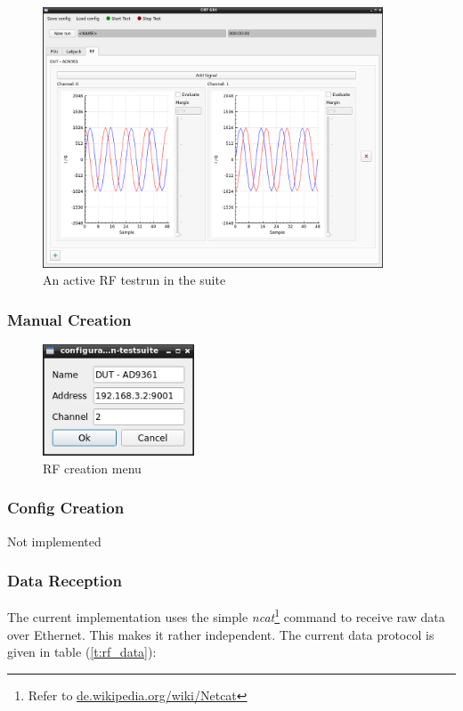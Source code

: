 \documentclass[10pt,a4paper]{article}
\begin{document}
		\begin{figure}[H]
\centering
\includegraphics[width=0.9\textwidth]{./6_RF_example.png}
\caption{An active RF testrun in the suite}
\label{f:rf_example}
		\end{figure}
	
		\subsubsection{Manual Creation}

		\begin{figure}[H]
\centering
\includegraphics[width=0.4\textwidth]{./6_RF_menu.png}
\caption{RF creation menu}
\label{f:rf_menu}
		\end{figure}
			
		\subsubsection{Config Creation}
		Not implemented
	
		\subsubsection{Data Reception}
		The current implementation uses the simple \textit{ncat}\footnote{Refer to \url{de.wikipedia.org/wiki/Netcat}} command to receive raw data over Ethernet. This makes it rather independent. The current data protocol is given in table (\ref{t:rf_data}):
		
\end{document}
